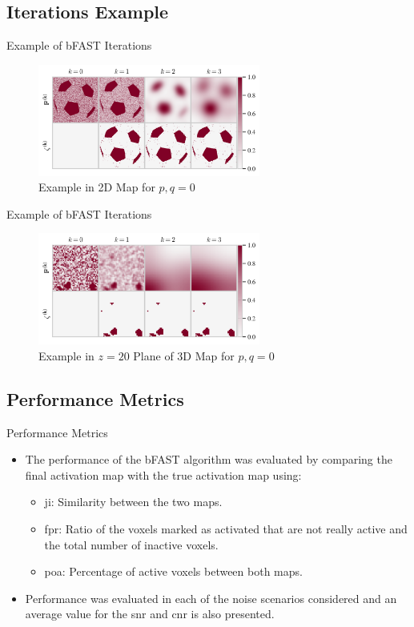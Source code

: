 \documentclass{beamer}
\begin{document}
\subsection{Iterations Example}

\begin{frame}{Example of bFAST Iterations}
\begin{figure}
\centering
\includegraphics[width=0.65\textwidth]{images/bfastEx2D.png}
\caption{Example in 2D Map for $p,q=0$}
\end{figure}
\end{frame}

\begin{frame}{Example of bFAST Iterations}
\begin{figure}
\centering
\includegraphics[width=0.65\textwidth]{images/bfastEx3D.png}
\caption{Example in $z=20$ Plane of 3D Map for $p,q=0$}
\end{figure}
\end{frame}

\subsection{Performance Metrics}

\begin{frame}{Performance Metrics}
\begin{itemize}
\item The performance of the bFAST algorithm was evaluated by comparing 
the final activation map with the true activation map using:
\begin{itemize}
\item \gls{ji}: Similarity between the two maps.
\item \gls{fpr}: Ratio of the voxels marked as activated that are not 
really active and the total number of inactive voxels.
\item \gls{poa}: Percentage of active voxels between both maps.
\end{itemize}
\item Performance was evaluated in each of the noise scenarios considered 
and an average value for the \gls{snr} and \gls{cnr} is also presented. 
\end{itemize}
\end{frame}
\end{document}
